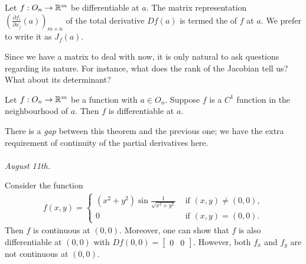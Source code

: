 \begin{definition}
    Let $f:O_{n} \to \mathbb{R}^{m}$ be differentiable at $a$. The matrix representation $\left( \frac{\partial f_{i}}{\partial x_{j}}(a) \right)_{m \times n}$ of the total derivative $Df(a)$ is termed the  of $f$ at $a$. We prefer to write it as $J_{f}(a)$.
\end{definition}

Since we have a matrix to deal with now, it is only natural to ask questions regarding its nature. For instance, what does the rank of the Jacobian tell us? What about its determinant?

\begin{theorem}
    Let $f:O_{n} \to \mathbb{R}^{m}$ be a function with $a \in O_{n}$. Suppose $f$ is a $C^{1}$ function in the neighbourhood of $a$. Then $f$ is differentiable at $a$.
\end{theorem}

There is a \textit{gap} between this theorem and the previous one; we have the extra requirement of continuity of the partial derivatives here.\\ \\
\textit{August 11th.}
\begin{example}
    Consider the function
    \begin{align}
        f(x,y) = \begin{cases}
            (x^{2}+y^{2}) \sin \frac{1}{\sqrt{x^{2}+y^{2}}} &\text{ if } (x,y) \neq (0,0),\\
            0 &\text{ if } (x,y) = (0,0).
        \end{cases}
    \end{align}
    Then $f$ is continuous at $(0,0)$. Moreover, one can show that $f$ is also differentiable at $(0,0)$ with $Df(0,0) = \begin{bmatrix}
        0 & 0
    \end{bmatrix}$. However, both $f_{x}$ and $f_{y}$ are not continuous at $(0,0)$.
\end{example}

